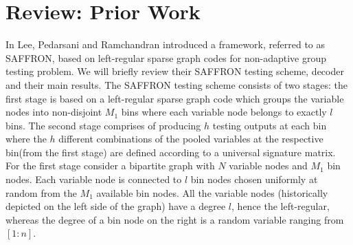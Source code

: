 \documentclass[conference,twocolumn]{IEEEtran}
\DeclareMathOperator*{\bigORtxt}{\scalerel*{\text{$\vee$}}{\textstyle\sum}}
\begin{document}
%

\section{Review: Prior Work}
\label{Sec:PriorWork}
In \cite{lee2015saffron} Lee, Pedarsani and Ramchandran introduced a framework, referred to as SAFFRON, based on left-regular sparse graph codes for non-adaptive group testing problem. We will briefly review their SAFFRON testing scheme, decoder and their main results. The SAFFRON testing scheme consists of two stages: the first stage is based on a left-regular sparse graph code which groups the variable nodes into non-disjoint $M_1$ bins where each variable node belongs to exactly $l$ bins. The second stage comprises of producing $h$ testing outputs at each bin where the $h$ different combinations of the pooled variables at the respective bin(from the first stage) are defined according to a universal signature matrix. For the first stage consider a bipartite graph with $N$ variable nodes and $M_1$ bin nodes. Each variable node is connected to $l$ bin nodes chosen uniformly at random from the $M_1$ available bin nodes. All the variable nodes (historically depicted on the left side of the graph) have a degree $l$, hence the left-regular, whereas the degree of a bin node on the right is a random variable ranging from $[1:n]$.
\end{document}
